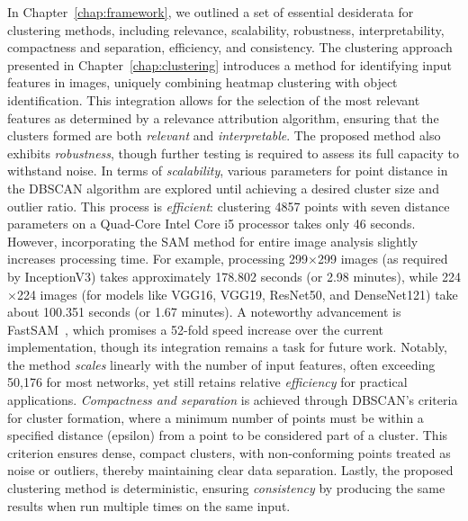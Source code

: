 \begin{Desideratum}
In Chapter~\ref{chap:framework}, we outlined a set of essential desiderata for clustering methods, including relevance, scalability, robustness, interpretability, compactness and separation, efficiency, and consistency. The clustering approach presented in Chapter~\ref{chap:clustering} introduces a method for identifying input features in images, uniquely combining heatmap clustering with object identification. This integration allows for the selection of the most relevant features as determined by a relevance attribution algorithm, ensuring that the clusters formed are both \emph{relevant} and \emph{interpretable}. The proposed method also exhibits \emph{robustness}, though further testing is required to assess its full capacity to withstand noise. In terms of \emph{scalability}, various parameters for point distance in the DBSCAN algorithm are explored until achieving a desired cluster size and outlier ratio. This process is \emph{efficient}: clustering 4857 points with seven distance parameters on a Quad-Core Intel Core i5 processor takes only 46 seconds. However, incorporating the SAM method for entire image analysis slightly increases processing time. For example, processing 299$\times$299 images (as required by InceptionV3) takes approximately 178.802 seconds (or 2.98 minutes), while 224$\times$224 images (for models like VGG16, VGG19, ResNet50, and DenseNet121) take about 100.351 seconds (or 1.67 minutes). A noteworthy advancement is FastSAM~\cite{}, which promises a 52-fold speed increase over the current implementation, though its integration remains a task for future work. Notably, the method \emph{scales} linearly with the number of input features, often exceeding 50,176 for most networks, yet still retains relative \emph{efficiency} for practical applications. \emph{Compactness and separation} is achieved through DBSCAN's criteria for cluster formation, where a minimum number of points must be within a specified distance (epsilon) from a point to be considered part of a cluster. This criterion ensures dense, compact clusters, with non-conforming points treated as noise or outliers, thereby maintaining clear data separation. Lastly, the proposed clustering method is deterministic, ensuring \emph{consistency} by producing the same results when run multiple times on the same input.



\end{Desideratum}
